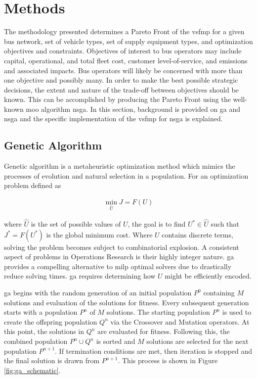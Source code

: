 \section{Methods}

The methodology presented determines a Pareto Front of the \gls{vsfmp} for a given bus network, set of vehicle types, set of supply equipment types, and optimization objectives and constraints. Objectives of interest to bus operators may include capital, operational, and total fleet cost, customer level-of-service, and emissions and associated impacts. Bus operators will likely be concerned with more than one objective and possibly many. In order to make the best possible strategic decisions, the extent and nature of the trade-off between objectives should be known. This can be accomplished by producing the Pareto Front using the well-known \gls{moo} algorithm \gls{nsga}. In this section, background is provided on \gls{ga} and \gls{nsga} and the specific implementation of the \gls{vsfmp} for \gls{nsga} is explained.

\subsection{Genetic Algorithm}

Genetic algorithm is a metaheuristic optimization method which mimics the processes of evolution and natural selection in a population. For an optimization problem defined as

\begin{gather}
	\min_{\hat{U}} J = F(U)
\end{gather}

where $\hat{U}$ is the set of possible values of $U$, the goal is to find $U^* \in \hat{U}$ such that $J^* = F(U^*)$ is the global minimum cost. Where $U$ contains discrete terms, solving the problem becomes subject to combinatorial explosion. A consistent aspect of problems in Operations Research is their highly integer nature. \gls{ga} provides a compelling alternative to \gls{milp} optimal solvers due to drastically reduce solving times. \gls{ga} requires determining how $U$ might be efficiently encoded.

\gls{ga} begins with the random generation of an initial population $P^0$ containing $M$ solutions and evaluation of the solutions for fitness. Every subsequent generation starts with a population $P^n$ of $M$ solutions. The starting population $P^n$ is used to create the offspring population $Q^n$ via the Crossover and Mutation operators. At this point, the solutions in $Q^n$ are evaluated for fitness. Following this, the combined population $P^n \cup Q^n$ is sorted and $M$ solutions are selected for the next population $P^{n + 1}$. If termination conditions are met, then iteration is stopped and the final solution is drawn from $P^{n + 1}$. This process is shown in Figure \ref{fig:ga_schematic}.

